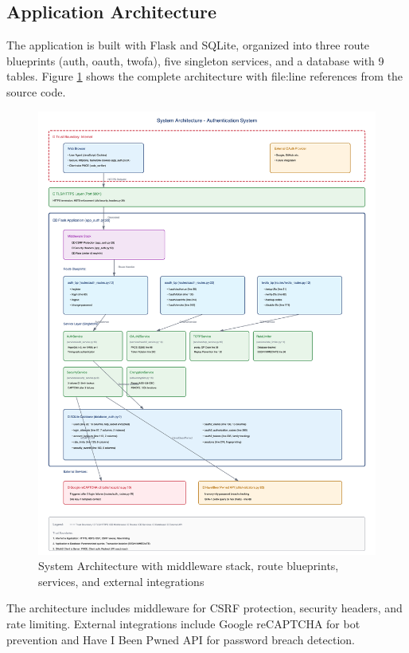 \documentclass[12pt,a4paper]{article}
\begin{document}
\subsection{Application Architecture}

The application is built with Flask and SQLite, organized into three route blueprints (auth, oauth, twofa), five singleton services, and a database with 9 tables. Figure \ref{fig:architecture} shows the complete architecture with file:line references from the source code.

\begin{figure}[H]
    \centering
    \includegraphics[width=\textwidth,height=0.85\textheight,keepaspectratio]{diagrams/1_system_architecture.png}
    \caption{System Architecture with middleware stack, route blueprints, services, and external integrations}
    \label{fig:architecture}
\end{figure}

The architecture includes middleware for CSRF protection, security headers, and rate limiting. External integrations include Google reCAPTCHA for bot prevention and Have I Been Pwned API for password breach detection.
\end{document}
